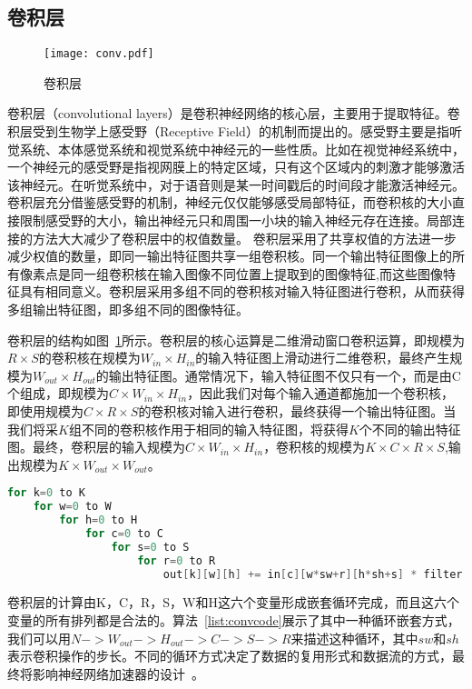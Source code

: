 \subsection{卷积层}
\begin{figure}[b]
  \centering
  \texttt{[image: conv.pdf]}
  \caption{\footnotesize 卷积层}
  \label{fig:conv_layer}
\end{figure}

卷积层（convolutional layers）是卷积神经网络的核心层，主要用于提取特征。卷积层受到生物学上感受野（Receptive Field）的机制而提出的。感受野主要是指听觉系统、本体感觉系统和视觉系统中神经元的一些性质。比如在视觉神经系统中，一个神经元的感受野是指视网膜上的特定区域，只有这个区域内的刺激才能够激活该神经元。在听觉系统中，对于语音则是某一时间戳后的时间段才能激活神经元。卷积层充分借鉴感受野的机制，神经元仅仅能够感受局部特征，而卷积核的大小直接限制感受野的大小，输出神经元只和周围一小块的输入神经元存在连接。局部连接的方法大大减少了卷积层中的权值数量。
卷积层采用了共享权值的方法进一步减少权值的数量，即同一输出特征图共享一组卷积核。同一个输出特征图像上的所有像素点是同一组卷积核在输入图像不同位置上提取到的图像特征,而这些图像特征具有相同意义。卷积层采用多组不同的卷积核对输入特征图进行卷积，从而获得多组输出特征图，即多组不同的图像特征。

卷积层的结构如图~\ref{fig:conv_layer}所示。卷积层的核心运算是二维滑动窗口卷积运算，即规模为$R\times S$的卷积核在规模为$W_{in}\times H_{in}$的输入特征图上滑动进行二维卷积，最终产生规模为$W_{out}\times H_{out}$的输出特征图。通常情况下，输入特征图不仅只有一个，而是由C个组成，即规模为$C\times W_{in}\times H_{in}$，因此我们对每个输入通道都施加一个卷积核，即使用规模为$C\times R\times S$的卷积核对输入进行卷积，最终获得一个输出特征图。当我们将采$K$组不同的卷积核作用于相同的输入特征图，将获得$K$个不同的输出特征图。最终，卷积层的输入规模为$C\times W_{in}\times H_{in}$，卷积核的规模为$K\times C\times R\times S$,输出规模为$K\times W_{out} \times W_{out}$。

\begin{lstlisting}[language=C, frame=single, basicstyle=\footnotesize, caption=六层卷积循环, label=list:convcode, captionpos=b]
for k=0 to K
    for w=0 to W
        for h=0 to H
            for c=0 to C
                for s=0 to S
                    for r=0 to R
                        out[k][w][h] += in[c][w*sw+r][h*sh+s] * filter[k][c][r][s]
\end{lstlisting}

卷积层的计算由K，C，R，S，W和H这六个变量形成嵌套循环完成，而且这六个变量的所有排列都是合法的。算法~\ref{list:convcode}展示了其中一种循环嵌套方式，我们可以用$N->W_{out}->H_{out}->C->S->R$来描述这种循环，其中$sw$和$sh$表示卷积操作的步长。不同的循环方式决定了数据的复用形式和数据流的方式，最终将影响神经网络加速器的设计~\cite{angshuman2017scnn}。

